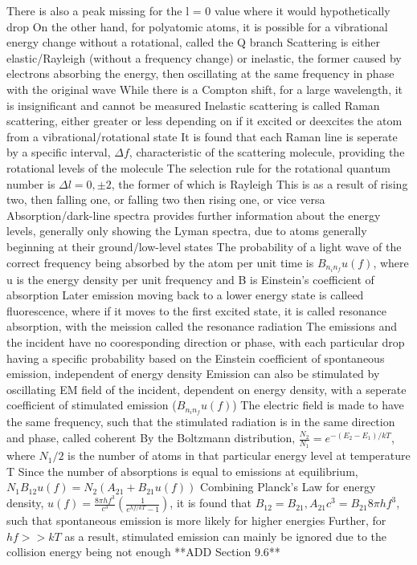 \documentclass[11 pt, twoside]{article}
\newenvironment{outline*}
{
	\begin{outline}[enumerate]
	}
	{\end{outline}
}
\begin{document}
\begin{outline*}
			\4 There is also a peak missing for the l = 0 value where it would hypothetically drop
			\4 On the other hand, for polyatomic atoms, it is possible for a vibrational energy change without a rotational, called the Q branch
\1 Scattering is either elastic/Rayleigh (without a frequency change) or inelastic, the former caused by electrons absorbing the energy, then oscillating at the same frequency in phase with the original wave
	\2 While there is a Compton shift, for a large wavelength, it is insignificant and cannot be measured
	\2 Inelastic scattering is called Raman scattering, either greater or less depending on if it excited or deexcites the atom from a vibrational/rotational state
		\3 It is found that each Raman line is seperate by a specific interval, $\Delta f$, characteristic of the scattering molecule, providing the rotational levels of the molecule
		\3 The selection rule for the rotational quantum number is $\Delta l = 0, \pm 2$, the former of which is Rayleigh
			\4 This is as a result of rising two, then falling one, or falling two then rising one, or vice versa
	\2 Absorption/dark-line spectra provides further information about the energy levels, generally only showing the Lyman spectra, due to atoms generally beginning at their ground/low-level states
		\3 The probability of a light wave of the correct frequency being absorbed by the atom per unit time is $B_{n_in_f}u(f)$, where u is the energy density per unit frequency and B is Einstein's coefficient of absorption
		\3 Later emission moving back to a lower energy state is calleed fluorescence, where if it moves to the first excited state, it is called resonance absorption, with the meission called the resonance radiation
			\4 The emissions and the incident have no cooresponding direction or phase, with each particular drop having a specific probability based on the Einstein coefficient of spontaneous emission, independent of energy density
		\3 Emission can also be stimulated by oscillating EM field of the incident, dependent on energy density, with a seperate coefficient of stimulated emission ($B_{n_in_f}u(f)$)
			\4 The electric field is made to have the same frequency, such that the stimulated radiation is in the same direction and phase, called coherent
	\2 By the Boltzmann distribution, $\frac{N_2}{N_1} = e^{-(E_2 - E_1)/kT}$, where $N_1/2$ is the number of atoms in that particular energy level at temperature T
		\3 Since the number of absorptions is equal to emissions at equilibrium, $N_1B_{12}u(f) = N_2(A_{21} + B_{21}u(f))$
		\3 Combining Planck's Law for energy density, $u(f) = \frac{8\pi hf^3}{c^3}(\frac{1}{e^{hf/kT} - 1})$, it is found that $B_{12} = B_{21}, A_{21}c^3 = B_{21}8\pi hf^3$, such that spontaneous emission is more likely for higher energies
			\4 Further, for $hf >> kT$ as a result, stimulated emission can mainly be ignored due to the collision energy being not enough
\1 **ADD Section 9.6**
\end{outline*}
\end{document}
